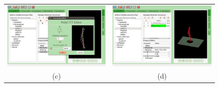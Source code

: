 \documentclass{article}
\begin{document}
\begin{figure}
\begin{center}
\begin{tabular}{cc}
      \includegraphics[scale=0.20]{03-PolyC.png} & \includegraphics[scale=0.20]{04-Registering.png} \\
          (c)  & (d)   \\

\end{tabular}
\end{center}
\end{figure}
\end{document}
